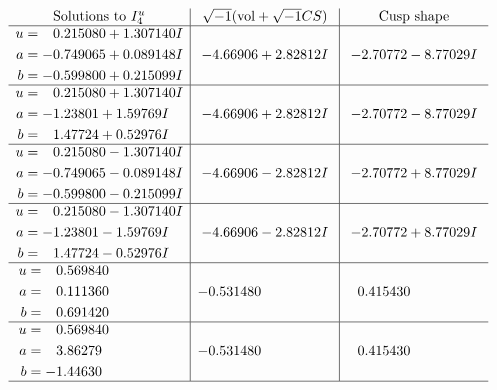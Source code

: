 \documentclass[1p]{elsarticle_modified}
\theoremstyle{definition}
\newcommand{\I}{\sqrt{-1}}
\begin{document}
$$\begin{array}{c|c|c}  
\text{Solutions to }I^u_{4}& \I (\text{vol} + \sqrt{-1}CS) & \text{Cusp shape}\\
 \hline 
\begin{aligned}
u &= \phantom{-}0.215080 + 1.307140 I \\
a &= -0.749065 + 0.089148 I \\
b &= -0.599800 + 0.215099 I\end{aligned}
 & -4.66906 + 2.82812 I & -2.70772 - 8.77029 I \\ \hline\begin{aligned}
u &= \phantom{-}0.215080 + 1.307140 I \\
a &= -1.23801 + 1.59769 I \\
b &= \phantom{-}1.47724 + 0.52976 I\end{aligned}
 & -4.66906 + 2.82812 I & -2.70772 - 8.77029 I \\ \hline\begin{aligned}
u &= \phantom{-}0.215080 - 1.307140 I \\
a &= -0.749065 - 0.089148 I \\
b &= -0.599800 - 0.215099 I\end{aligned}
 & -4.66906 - 2.82812 I & -2.70772 + 8.77029 I \\ \hline\begin{aligned}
u &= \phantom{-}0.215080 - 1.307140 I \\
a &= -1.23801 - 1.59769 I \\
b &= \phantom{-}1.47724 - 0.52976 I\end{aligned}
 & -4.66906 - 2.82812 I & -2.70772 + 8.77029 I \\ \hline\begin{aligned}
u &= \phantom{-}0.569840\phantom{ +0.000000I} \\
a &= \phantom{-}0.111360\phantom{ +0.000000I} \\
b &= \phantom{-}0.691420\phantom{ +0.000000I}\end{aligned}
 & -0.531480\phantom{ +0.000000I} & \phantom{-}0.415430\phantom{ +0.000000I} \\ \hline\begin{aligned}
u &= \phantom{-}0.569840\phantom{ +0.000000I} \\
a &= \phantom{-}3.86279\phantom{ +0.000000I} \\
b &= -1.44630\phantom{ +0.000000I}\end{aligned}
 & -0.531480\phantom{ +0.000000I} & \phantom{-}0.415430\phantom{ +0.000000I}\\
 \hline 
 \end{array}$$\newpage\newpage\renewcommand{\arraystretch}{1}
\end{document}
